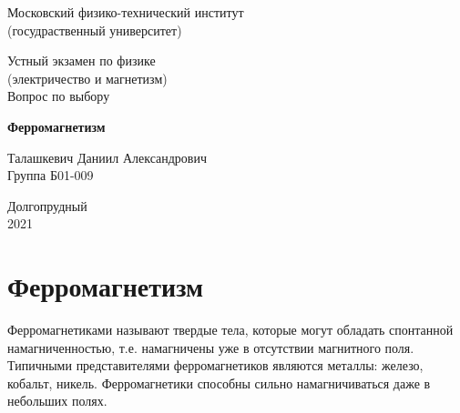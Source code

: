 \documentclass[a4paper,14pt]{article} %
\begin{document}


\begin{titlepage}

	\newpage
	\begin{center}
		\normalsize Московский физико-технический институт \\(госудраственный 			университет)
	\end{center}

	\vspace{6em}

	\begin{center}
		\Large Устный экзамен по физике \\(электричество и магнетизм) \\
        \Large Вопрос по выбору
	\end{center}

	\vspace{1em}

	\begin{center}
		\Large \textbf{Ферромагнетизм}
	\end{center}

	\vspace{2em}

	\begin{center}
		\large Талашкевич Даниил Александрович\\
		Группа Б01-009
	\end{center}

	\vspace{\fill}

	\begin{center}
	Долгопрудный \\2021
	\end{center}
	
\end{titlepage}



	\thispagestyle{empty}
	\newpage
	\tableofcontents
	\newpage
	\setcounter{page}{1}


				
\section{Ферромагнетизм}

Ферромагнетиками называют твердые тела, которые могут обладать спонтанной намагниченностью, т.е. намагничены уже в отсутствии магнитного поля. Типичными представителями ферромагнетиков являются металлы: железо, кобальт, никель. Ферромагнетики способны сильно намагничиваться даже в небольших полях.
\end{document}
